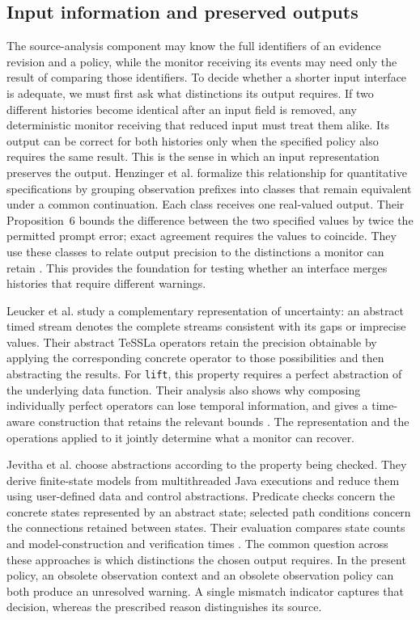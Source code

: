 \documentclass[preprint,11pt]{elsarticle}
\newcommand{\code}[1]{\texttt{#1}}
\begin{document}
\subsection{Input information and preserved outputs}\label{sec:related-work}
The source-analysis component may know the full identifiers of an evidence revision and a policy, while the monitor receiving its events may need only the result of comparing those identifiers. To decide whether a shorter input interface is adequate, we must first ask what distinctions its output requires. If two different histories become identical after an input field is removed, any deterministic monitor receiving that reduced input must treat them alike. Its output can be correct for both histories only when the specified policy also requires the same result. This is the sense in which an input representation preserves the output. Henzinger et al. formalize this relationship for quantitative specifications by grouping observation prefixes into classes that remain equivalent under a common continuation. Each class receives one real-valued output. Their Proposition~6 bounds the difference between the two specified values by twice the permitted prompt error; exact agreement requires the values to coincide. They use these classes to relate output precision to the distinctions a monitor can retain \cite{henzinger2022abstract}. This provides the foundation for testing whether an interface merges histories that require different warnings.

Leucker et al. study a complementary representation of uncertainty: an abstract timed stream denotes the complete streams consistent with its gaps or imprecise values. Their abstract TeSSLa operators retain the precision obtainable by applying the corresponding concrete operator to those possibilities and then abstracting the results. For \code{lift}, this property requires a perfect abstraction of the underlying data function. Their analysis also shows why composing individually perfect operators can lose temporal information, and gives a time-aware construction that retains the relevant bounds \cite{leucker2019partial}. The representation and the operations applied to it jointly determine what a monitor can recover.

Jevitha et al. choose abstractions according to the property being checked. They derive finite-state models from multithreaded Java executions and reduce them using user-defined data and control abstractions. Predicate checks concern the concrete states represented by an abstract state; selected path conditions concern the connections retained between states. Their evaluation compares state counts and model-construction and verification times \cite{jevitha2024abstract}. The common question across these approaches is which distinctions the chosen output requires. In the present policy, an obsolete observation context and an obsolete observation policy can both produce an unresolved warning. A single mismatch indicator captures that decision, whereas the prescribed reason distinguishes its source.
\end{document}
